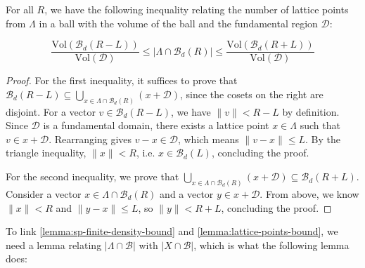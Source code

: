 \begin{theorem}\label{lemma:lattice-points-bound}\leanok
  For all $R$, we have the following inequality relating the number of lattice points from $\Lambda$ in a ball with the volume of the ball and the fundamental region $\mathcal{D}$:

  \[
    \frac{\mathrm{Vol}(\mathcal{B}_d(R - L))}{\mathrm{Vol}(\mathcal{D})}
    \leq \left|\Lambda \cap \mathcal{B}_d(R)\right|
    \leq \frac{\mathrm{Vol}(\mathcal{B}_d(R + L))}{\mathrm{Vol}(\mathcal{D})}
  \]
\end{theorem}
\begin{proof}
For the first inequality, it suffices to prove that $\mathcal{B}_d(R - L) \subseteq \bigcup_{x \in \Lambda \cap \mathcal{B}_d(R)} (x + \mathcal{D})$, since the cosets on the right are disjoint. For a vector $v \in \mathcal{B}_d(R - L)$, we have $\|v\| < R - L$ by definition. Since $\mathcal{D}$ is a fundamental domain, there exists a lattice point $x \in \Lambda$ such that $v \in x + \mathcal{D}$. Rearranging gives $v - x \in \mathcal{D}$, which means $\|v - x\| \leq L$. By the triangle inequality, $\|x\| < R$, i.e. $x \in \mathcal{B}_d(L)$, concluding the proof.

  For the second inequality, we prove that $\bigcup_{x \in \Lambda \cap \mathcal{B}_d(R)} (x + \mathcal{D}) \subseteq \mathcal{B}_d(R + L)$. Consider a vector $x \in \Lambda \cap \mathcal{B}_d(R)$ and a vector $y \in x + \mathcal{D}$. From above, we know $\|x\| < R$ and $\|y - x\| \leq L$, so $\|y\| < R + L$, concluding the proof.
\end{proof}

To link \cref{lemma:sp-finite-density-bound} and \cref{lemma:lattice-points-bound}, we need a lemma relating $|\Lambda \cap \mathcal{B}|$ with $|X \cap \mathcal{B}|$, which is what the following lemma does:

